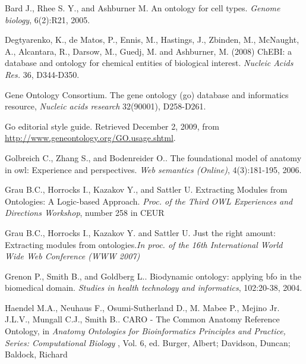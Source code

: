 \documentclass[jou]{ao2e}%
\begin{document}
\begin{thebibliography}{}

 Bard J., Rhee S. Y., and Ashburner M. An ontology for cell types. \textit{Genome biology}, 6(2):R21, 2005. 


 Degtyarenko, K., de Matos, P., Ennis, M., Hastings, J., Zbinden, M., McNaught, A., Alcantara, R., Darsow, M., Guedj, M. and Ashburner, M. (2008) ChEBI: a database and ontology for chemical entities of biological interest. \textit{Nucleic Acids Res.} 36, D344-D350.

Gene Ontology Consortium. The gene ontology (go) database and informatics resource, \textit{Nucleic acids research} 32(90001), D258-D261.

 Go editorial style guide. Retrieved December 2, 2009, from \url{http://www.geneontology.org/GO.usage.shtml}.

 Golbreich C., Zhang S., and Bodenreider O.. The foundational model of anatomy in owl: Experience and perspectives. \textit{Web semantics (Online)}, 4(3):181-195, 2006. 

 Grau B.C., Horrocks I., Kazakov Y., and Sattler U. Extracting Modules from Ontologies: A Logic-based Approach. \textit{Proc. of the Third OWL Experiences and Directions Workshop}, number 258 in CEUR

 Grau B.C., Horrocks I., Kazakov Y. and Sattler U. Just the right amount: Extracting modules from ontologies.\textit{In proc. of the 16th International World Wide Web Conference (WWW 2007)}

 Grenon P., Smith B., and Goldberg L.. Biodynamic ontology: applying bfo in the biomedical domain. \textit{Studies in health 
technology and informatics}, 102:20-38, 2004. 

 Haendel M.A., Neuhaus F., Osumi-Sutherland D., M. Mabee P., Mejino Jr. J.L.V., Mungall C.J., Smith B.. CARO - The Common Anatomy Reference Ontology, in \textit{Anatomy Ontologies for Bioinformatics Principles and Practice, Series: Computational Biology} , Vol. 6, ed. Burger, Albert; Davidson, Duncan; Baldock, Richard


\end{thebibliography}
\end{document}

